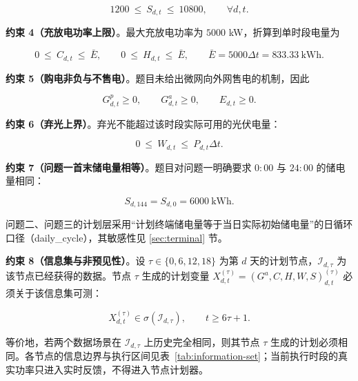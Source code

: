 \begin{equation}
	1200\ \le\ S_{d,t}\ \le\ 10800,\qquad \forall d,t .
	\label{eq:soc-bound}
\end{equation}

\textbf{约束 4（充放电功率上限）}。最大充放电功率为 $5000$ kW，折算到单时段电量为

\begin{equation}
	0\ \le\ C_{d,t}\ \le\ \bar E,\qquad 0\ \le\ H_{d,t}\ \le\ \bar E,
	\qquad \bar E=5000\Delta t=833.33\ \text{kWh}.
	\label{eq:power}
\end{equation}

\textbf{约束 5（购电非负与不售电）}。题目未给出微网向外网售电的机制，因此

\begin{equation}
	G^{p}_{d,t}\ge 0,\qquad G^{a}_{d,t}\ge 0,\qquad E_{d,t}\ge 0 .
	\label{eq:nonneg}
\end{equation}

\textbf{约束 6（弃光上界）}。弃光不能超过该时段实际可用的光伏电量：

\begin{equation}
	0\ \le\ W_{d,t}\ \le\ P_{d,t}\Delta t .
	\label{eq:curtail}
\end{equation}

\textbf{约束 7（问题一首末储电量相等）}。题目对问题一明确要求 $0{:}00$ 与 $24{:}00$ 的储电量相同：

\begin{equation}
	S_{d,144}=S_{d,0}=6000\ \text{kWh}.
	\label{eq:terminal-q1}
\end{equation}

问题二、问题三的计划层采用“计划终端储电量等于当日实际初始储电量”的日循环口径（daily\_cycle），其敏感性见 \ref{sec:terminal} 节。

\textbf{约束 8（信息集与非预见性）}。设 $\tau\in\{0,6,12,18\}$ 为第 $d$ 天的计划节点，$\mathcal I_{d,\tau}$ 为该节点已经获得的数据。节点 $\tau$ 生成的计划变量 $X_{d,t}^{(\tau)}=(G^a,C,H,W,S)_{d,t}^{(\tau)}$ 必须关于该信息集可测：

\begin{equation}
	X_{d,t}^{(\tau)}\in\sigma(\mathcal I_{d,\tau}),\qquad t\ge 6\tau+1.
	\label{eq:causality}
\end{equation}

等价地，若两个数据场景在 $\mathcal I_{d,\tau}$ 上历史完全相同，则其节点 $\tau$ 生成的计划必须相同。各节点的信息边界与执行区间见表~\ref{tab:information-set}；当前执行时段的真实功率只进入实时反馈，不得进入节点计划器。

